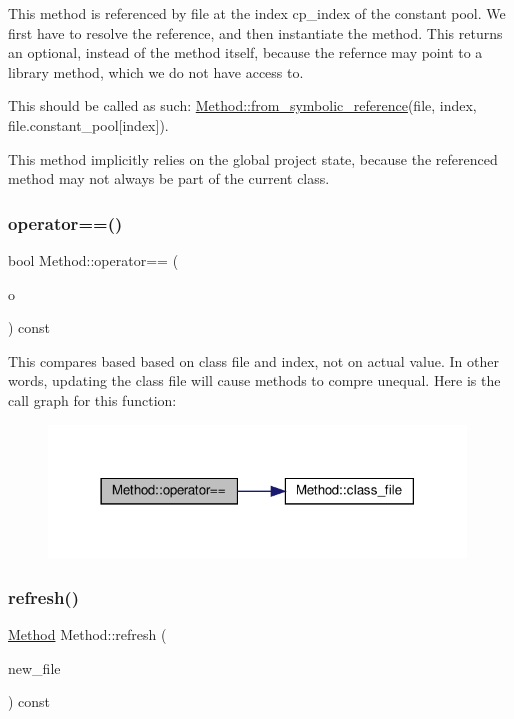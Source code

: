 This method is referenced by {\ttfamily file} at the index {\ttfamily cp\+\_\+index} of the constant pool. We first have to resolve the reference, and then instantiate the method. This returns an optional, instead of the method itself, because the refernce may point to a library method, which we do not have access to.

This should be called as such\+: \hyperlink{classMethod_adddc54ce699dfb1ba305595507085a29}{Method\+::from\+\_\+symbolic\+\_\+reference}(file, index, file.\+constant\+\_\+pool\mbox{[}index\mbox{]}).

This method implicitly relies on the global project state, because the referenced method may not always be part of the current class. \mbox{\label{classMethod_afa02f09f3037782d08463433465181b6}} 
\subsubsection{\texorpdfstring{operator==()}{operator==()}}
{\footnotesize\ttfamily bool Method\+::operator== (\begin{DoxyParamCaption}\item[{const \hyperlink{classMethod}{Method} \&}]{o }\end{DoxyParamCaption}) const}

This compares based based on class file and index, not on actual value. In other words, updating the class file will cause methods to compre unequal. Here is the call graph for this function\+:\nopagebreak
\begin{figure}[H]
\begin{center}
\leavevmode
\includegraphics[width=314pt]{classMethod_afa02f09f3037782d08463433465181b6_cgraph}
\end{center}
\end{figure}
\mbox{\label{classMethod_ac6a47d5797a62c5ffbb39df54ff7171d}} 
\subsubsection{\texorpdfstring{refresh()}{refresh()}}
{\footnotesize\ttfamily \hyperlink{classMethod}{Method} Method\+::refresh (\begin{DoxyParamCaption}\item[{const Class\+File \&}]{new\+\_\+file }\end{DoxyParamCaption}) const}

